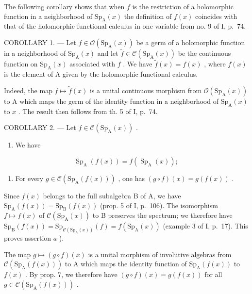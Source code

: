 The following corollary shows that when \(f\) is the restriction of a holomorphic function in a neighborhood of \(\mathrm{Sp}_{\mathrm{A}}(x)\) the definition of \(f(x)\) coincides with that of the holomorphic functional calculus in one variable from no. 9 of I, p.~74.

COROLLARY 1. --- Let \(f \in \mathcal{O}(\mathrm{Sp}_{\mathrm{A}}(x))\) be a germ of a holomorphic function in a neighborhood of \(\mathrm{Sp}_{\mathrm{A}}(x)\) and let \(\widetilde{f} \in \mathcal{C}(\mathrm{Sp}_{\mathrm{A}}(x))\) be the continuous function on \(\mathrm{Sp}_{\mathrm{A}}(x)\) associated with \(f\) . We have \(\widetilde{f}(x) = f(x)\) , where \(f(x)\) is the element of A given by the holomorphic functional calculus.

Indeed, the map \(f \mapsto \widetilde{f}(x)\) is a unital continuous morphism from \(\mathcal{O}(\mathrm{Sp}_{\mathrm{A}}(x))\) to A which maps the germ of the identity function in a neighborhood of \(\mathrm{Sp}_{\mathrm{A}}(x)\) to \(x\) . The result then follows from th. 5 of I, p.~74.

COROLLARY 2. --- Let \(f \in \mathcal{C}(\mathrm{Sp}_{\mathrm{A}}(x))\) .

\begin{enumerate}
\def\labelenumi{\alph{enumi})}
\tightlist
\item
  We have
\end{enumerate}

\[
\operatorname{Sp} _ {\mathrm{A}} (f (x)) = f (\operatorname{Sp} _ {\mathrm{A}} (x));
\]

\begin{enumerate}
\def\labelenumi{\alph{enumi})}
\setcounter{enumi}{1}
\tightlist
\item
  For every \(g \in \mathcal{C}(\mathrm{Sp}_{\mathrm{A}}(f(x)))\) , one has \((g \circ f)(x) = g(f(x))\) .
\end{enumerate}

Since \(f(x)\) belongs to the full subalgebra B of A, we have \(\mathrm{Sp}_{\mathrm{A}}(f(x)) = \mathrm{Sp}_{\mathrm{B}}(f(x))\) (prop. 5 of I, p.~106). The isomorphism \(f \mapsto f(x)\) of \(\mathcal{C}(\mathrm{Sp}_{\mathrm{A}}(x))\) to B preserves the spectrum; we therefore have \(\mathrm{Sp}_{\mathrm{B}}(f(x)) = \mathrm{Sp}_{\mathcal{C}(\mathrm{Sp}_{\mathrm{A}}(x))}(f) = f(\mathrm{Sp}_{\mathrm{A}}(x))\) (example 3 of I, p.~17). This proves assertion \(a\) ).

The map \(g \mapsto (g \circ f)(x)\) is a unital morphism of involutive algebras from \(\mathcal{C}(\mathrm{Sp}_{\mathrm{A}}(f(x)))\) to A which maps the identity function of \(\mathrm{Sp}_{\mathrm{A}}(f(x))\) to \(f(x)\) . By prop. 7, we therefore have \((g \circ f)(x) = g(f(x))\) for all \(g \in \mathcal{C}(\mathrm{Sp}_{\mathrm{A}}(f(x)))\) .

